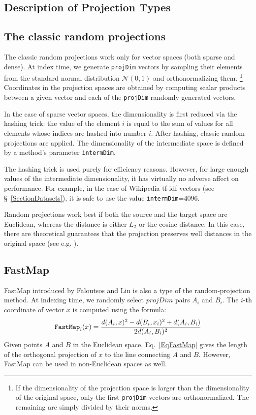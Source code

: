 \documentclass[runningheads,a4paper]{llncs}
\newcommand{\ttt}[1]{\texttt{#1}}
\begin{document}

%


\begin{appendix}
\section{Description of Projection Types}\label{SectionProjDetails}
\subsection{The classic random projections} 
The classic random projections work only for vector spaces (both sparse and dense).
At index time, we generate \ttt{projDim} vectors by sampling their elements from
the standard normal distribution $\mathcal{N}(0,1)$ and orthonormalizing them. \footnote{If 
the dimensionality of the projection space is larger than the dimensionality of the original
space, only the first \ttt{projDim} vectors are orthonormalized. The remaining are simply
divided by their norms.}
Coordinates in the projection spaces are obtained by computing scalar products
between a given vector and each of the \ttt{projDim} randomly generated vectors.

In the case of sparse vector spaces, the dimensionality is first reduced via the hashing trick:
the value of the element $i$ is equal to the sum of values for all elements whose indices are 
hashed into number $i$. 
After hashing, classic random projections are applied. 
The dimensionality of the intermediate space is defined by a method's parameter \ttt{intermDim}. 

The hashing trick is used purely for efficiency reasons. 
However, for large enough values of the intermediate
dimensionality, it has virtually no adverse affect on performance.
For example, in the case of Wikipedia tf-idf vectors (see \S~\ref{SectionDatasets}),
it is safe to use the value \ttt{intermDim}=4096.

Random projections work best if both the source and the target space are Euclidean,
whereas the distance is either $L_2$ or the cosine distance.
In this case, there are theoretical guarantees that the projection preserves
well distances in the original space (see e.g. \cite{bingham2001random}).

\subsection{FastMap} 
FastMap introduced by Faloutsos and Lin \cite{faloutsos1995fastmap}
is also a type of the random-projection method. 
At indexing time, we randomly select $projDim$ pairs $A_i$ and $B_i$.
The \mbox{$i$-th} coordinate of vector $x$ is computed using the formula:
\begin{equation}\label{EqFastMap}
\mbox{\ttt{FastMap}}_{i}(x)  = \frac{d(A_i,x)^2 - d(B_i,x_i)^2 + d(A_i,B_i)}{2 d(A_i,B_i)^2}
\end{equation}
Given points $A$ and $B$ in the Euclidean space, Eq.~\ref{EqFastMap} gives the length of the
orthogonal projection of $x$ to the line connecting $A$ and $B$.
However, FastMap can be used in non-Euclidean spaces as well.


\end{appendix}
\end{document}
